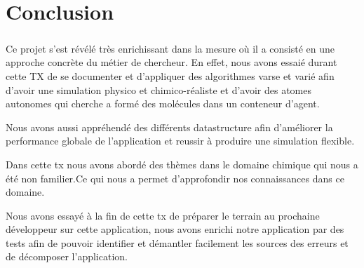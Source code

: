 \chapter*{Conclusion}


\paragraph{}


Ce projet s’est révélé très enrichissant dans la mesure où il a consisté en une approche concrète du métier de chercheur. En effet, nous avons essaié durant cette TX de se documenter et d'appliquer des algorithmes varse et varié afin d'avoir une simulation physico et chimico-réaliste et d'avoir des atomes autonomes qui cherche a formé des molécules dans un conteneur d'agent.

Nous avons aussi appréhendé des différents datastructure afin d'améliorer la performance globale de l'application et reussir à produire une simulation flexible.

Dans cette tx nous avons abordé des thèmes dans le domaine chimique qui nous a été non familier.Ce qui nous a permet d'approfondir nos connaissances dans ce domaine. 

Nous avons essayé à la fin de cette tx de préparer le terrain au prochaine développeur sur cette application, nous avons enrichi notre application par des tests afin de pouvoir identifier et démantler facilement les sources des erreurs et de décomposer l'application.

 